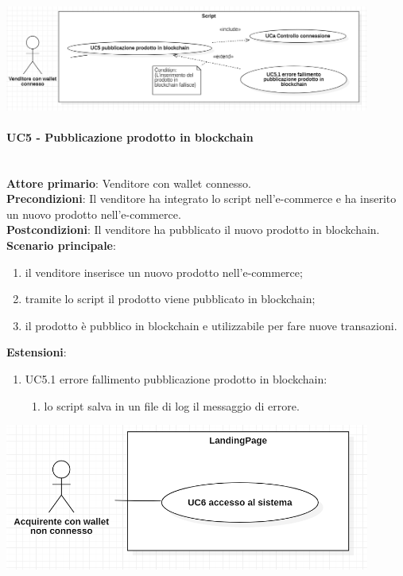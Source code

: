\documentclass[a4paper, 12pt]{article}
\begin{document}
\includegraphics[width=0.9\textwidth]{UC_script}

\paragraph{UC5 - Pubblicazione prodotto in blockchain}\\
\textbf{Attore primario}: Venditore con wallet connesso.\\
\textbf{Precondizioni}: Il venditore ha integrato lo script nell'e-commerce e ha inserito un nuovo prodotto nell'e-commerce.\\
\textbf{Postcondizioni}: Il venditore ha pubblicato il nuovo prodotto in blockchain.\\
\textbf{Scenario principale}:
\begin{enumerate}
    \item il venditore inserisce un nuovo prodotto nell'e-commerce;
    \item tramite lo script il prodotto viene pubblicato in blockchain;
    \item il prodotto è pubblico in blockchain e utilizzabile per fare nuove transazioni.
\end{enumerate}
\textbf{Estensioni}:
\begin{enumerate}
    \item UC5.1 errore fallimento pubblicazione prodotto in blockchain:
    \begin{enumerate}
        \item lo script salva in un file di log il messaggio di errore.
    \end{enumerate}
\end{enumerate}

\includegraphics[width=0.9\textwidth]{UC_LP1}
\end{document}
